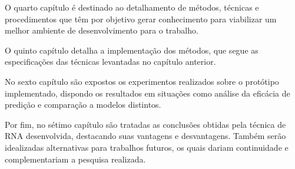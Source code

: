 O quarto capítulo é destinado ao detalhamento de métodos, técnicas e procedimentos que têm por objetivo gerar conhecimento para viabilizar um melhor ambiente de desenvolvimento para o trabalho.

O quinto capítulo detalha a implementação dos métodos, que segue as especificações das técnicas levantadas no capítulo anterior.

No sexto capítulo são expostos os experimentos realizados sobre o protótipo implementado, dispondo os resultados em situações como análise da eficácia de predição e comparação a modelos distintos.

Por fim, no sétimo capítulo são tratadas as conclusões obtidas pela técnica de RNA desenvolvida, destacando suas vantagens e desvantagens. Também serão idealizadas alternativas para trabalhos futuros, os quais dariam continuidade e complementariam a pesquisa realizada.